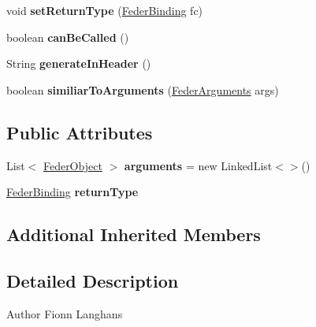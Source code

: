 \begin{DoxyCompactItemize}
\item 
\mbox{\label{classfeder_1_1types_1_1FederInterface_a726d0bf8d4fcfac49ca08b8f18a89e33}} 
void {\bfseries set\+Return\+Type} (\hyperlink{classfeder_1_1types_1_1FederBinding}{Feder\+Binding} fc)
\item 
\mbox{\label{classfeder_1_1types_1_1FederInterface_a42f08a4aecfb2c64278f8ae95c01e29d}} 
boolean {\bfseries can\+Be\+Called} ()
\item 
\mbox{\label{classfeder_1_1types_1_1FederInterface_aab048e723c0f711346828ba7ceca074b}} 
String {\bfseries generate\+In\+Header} ()
\item 
\mbox{\label{classfeder_1_1types_1_1FederInterface_a821190cccc9161fa3059306794212616}} 
boolean {\bfseries similiar\+To\+Arguments} (\hyperlink{interfacefeder_1_1types_1_1FederArguments}{Feder\+Arguments} args)
\end{DoxyCompactItemize}
\subsection*{Public Attributes}
\begin{DoxyCompactItemize}
\item 
\mbox{\label{classfeder_1_1types_1_1FederInterface_a78442c5baa0cb3b5c86deece8ddd5654}} 
List$<$ \hyperlink{classfeder_1_1types_1_1FederObject}{Feder\+Object} $>$ {\bfseries arguments} = new Linked\+List$<$$>$()
\item 
\mbox{\label{classfeder_1_1types_1_1FederInterface_a9bb2f944bfe9f72fda9716168203cca8}} 
\hyperlink{classfeder_1_1types_1_1FederBinding}{Feder\+Binding} {\bfseries return\+Type}
\end{DoxyCompactItemize}
\subsection*{Additional Inherited Members}


\subsection{Detailed Description}
\begin{DoxyAuthor}{Author}
Fionn Langhans 
\end{DoxyAuthor}


